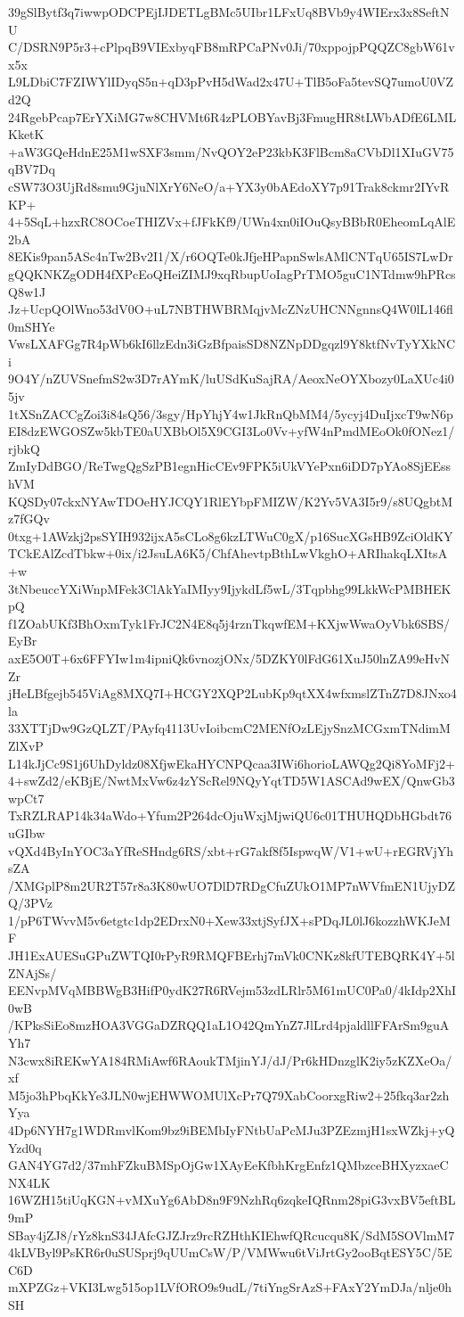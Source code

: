 39gSlBytf3q7iwwpODCPEjIJDETLgBMc5UIbr1LFxUq8BVb9y4WIErx3x8SeftNU
C/DSRN9P5r3+cPlpqB9VIExbyqFB8mRPCaPNv0Ji/70xppojpPQQZC8gbW61vx5x
L9LDbiC7FZIWYlIDyqS5n+qD3pPvH5dWad2x47U+TlB5oFa5tevSQ7umoU0VZd2Q
24RgebPcap7ErYXiMG7w8CHVMt6R4zPLOBYavBj3FmugHR8tLWbADfE6LMLKketK
+aW3GQeHdnE25M1wSXF3smm/NvQOY2eP23kbK3FlBcm8aCVbDl1XIuGV75qBV7Dq
cSW73O3UjRd8smu9GjuNlXrY6NeO/a+YX3y0bAEdoXY7p91Trak8ckmr2IYvRKP+
4+5SqL+hzxRC8OCoeTHIZVx+fJFkKf9/UWn4xn0iIOuQsyBBbR0EheomLqAlE2bA
8EKis9pan5ASc4nTw2Bv2I1/X/r6OQTe0kJfjeHPapnSwlsAMlCNTqU65IS7LwDr
gQQKNKZgODH4fXPcEoQHeiZIMJ9xqRbupUoIagPrTMO5guC1NTdmw9hPRcsQ8w1J
Jz+UcpQOlWno53dV0O+uL7NBTHWBRMqjvMcZNzUHCNNgnnsQ4W0lL146fl0mSHYe
VwsLXAFGg7R4pWb6kI6llzEdn3iGzBfpaisSD8NZNpDDgqzl9Y8ktfNvTyYXkNCi
9O4Y/nZUVSnefmS2w3D7rAYmK/luUSdKuSajRA/AeoxNeOYXbozy0LaXUc4i05jv
1tXSnZACCgZoi3i84sQ56/3sgy/HpYhjY4w1JkRnQbMM4/5ycyj4DuIjxcT9wN6p
EI8dzEWGOSZw5kbTE0aUXBbOl5X9CGI3Lo0Vv+yfW4nPmdMEoOk0fONez1/rjbkQ
ZmIyDdBGO/ReTwgQgSzPB1egnHicCEv9FPK5iUkVYePxn6iDD7pYAo8SjEEsshVM
KQSDy07ckxNYAwTDOeHYJCQY1RlEYbpFMIZW/K2Yv5VA3I5r9/s8UQgbtMz7fGQv
0txg+1AWzkj2psSYIH932ijxA5sCLo8g6kzLTWuC0gX/p16SucXGsHB9ZciOldKY
TCkEAlZcdTbkw+0ix/i2JsuLA6K5/ChfAhevtpBthLwVkghO+ARIhakqLXItsA+w
3tNbeuccYXiWnpMFek3ClAkYaIMIyy9IjykdLf5wL/3Tqpbhg99LkkWcPMBHEKpQ
f1ZOabUKf3BhOxmTyk1FrJC2N4E8q5j4rznTkqwfEM+KXjwWwaOyVbk6SBS/EyBr
axE5O0T+6x6FFYIw1m4ipniQk6vnozjONx/5DZKY0lFdG61XuJ50lnZA99eHvNZr
jHeLBfgejb545ViAg8MXQ7I+HCGY2XQP2LubKp9qtXX4wfxmslZTnZ7D8JNxo4la
33XTTjDw9GzQLZT/PAyfq4113UvIoibcmC2MENfOzLEjySnzMCGxmTNdimMZlXvP
L14kJjCc9S1j6UhDyldz08XfjwEkaHYCNPQcaa3IWi6horioLAWQg2Qi8YoMFj2+
4+swZd2/eKBjE/NwtMxVw6z4zYScRel9NQyYqtTD5W1ASCAd9wEX/QnwGb3wpCt7
TxRZLRAP14k34aWdo+Yfum2P264dcOjuWxjMjwiQU6c01THUHQDbHGbdt76uGIbw
vQXd4ByInYOC3aYfReSHndg6RS/xbt+rG7akf8f5IspwqW/V1+wU+rEGRVjYhsZA
/XMGplP8m2UR2T57r8a3K80wUO7DlD7RDgCfuZUkO1MP7nWVfmEN1UjyDZQ/3PVz
1/pP6TWvvM5v6etgtc1dp2EDrxN0+Xew33xtjSyfJX+sPDqJL0lJ6kozzhWKJeMF
JH1ExAUESuGPuZWTQI0rPyR9RMQFBErhj7mVk0CNKz8kfUTEBQRK4Y+5lZNAjSs/
EENvpMVqMBBWgB3HifP0ydK27R6RVejm53zdLRlr5M61mUC0Pa0/4kIdp2XhI0wB
/KPksSiEo8mzHOA3VGGaDZRQQ1aL1O42QmYnZ7JlLrd4pjaldllFFArSm9guAYh7
N3cwx8iREKwYA184RMiAwf6RAoukTMjinYJ/dJ/Pr6kHDnzglK2iy5zKZXeOa/xf
M5jo3hPbqKkYe3JLN0wjEHWWOMUlXcPr7Q79XabCoorxgRiw2+25fkq3ar2zhYya
4Dp6NYH7g1WDRmvlKom9bz9iBEMbIyFNtbUaPcMJu3PZEzmjH1sxWZkj+yQYzd0q
GAN4YG7d2/37mhFZkuBMSpOjGw1XAyEeKfbhKrgEnfz1QMbzceBHXyzxaeCNX4LK
16WZH15tiUqKGN+vMXuYg6AbD8n9F9NzhRq6zqkeIQRnm28piG3vxBV5eftBL9mP
SBay4jZJ8/rYz8knS34JAfcGJZJrz9rcRZHthKIEhwfQRcucqu8K/SdM5SOVlmM7
4kLVByl9PsKR6r0uSUSprj9qUUmCsW/P/VMWwu6tViJrtGy2ooBqtESY5C/5EC6D
mXPZGz+VKI3Lwg515op1LVfORO9s9udL/7tiYngSrAzS+FAxY2YmDJa/nlje0hSH
